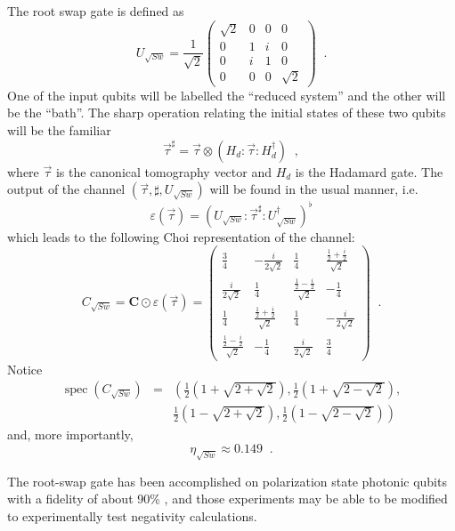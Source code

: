 The root swap gate is defined as
$$
U_{\sqrt{Sw}} = \frac{1}{\sqrt{2}}\begin{pmatrix}
\sqrt{2}&0&0&0\\
0&1&i&0\\
0&i&1&0\\
0&0&0&\sqrt{2}
\end{pmatrix}\;\;.
$$
One of the input qubits will be labelled the ``reduced system'' and the other will be the ``bath''.  The sharp operation relating the initial states of these two qubits will be the familiar 
$$
\vec{\tau}^\sharp = \vec{\tau}\otimes\left(H_d:\vec{\tau}:H_d^\dagger\right)\;\;,
$$
where $\vec{\tau}$ is the canonical tomography vector and $H_d$ is the Hadamard gate.  The output of the channel $(\vec{\tau},\sharp,U_{\sqrt{Sw}})$ will be found in the usual manner, i.e.\
$$
\varepsilon(\vec{\tau}) = \left(U_{\sqrt{Sw}}:\vec{\tau}^\sharp:U_{\sqrt{Sw}}^\dagger\right)^\flat
$$
which leads to the following Choi representation of the channel:
$$
C_{\sqrt{Sw}} = \mathbf{C}\odot\varepsilon\left(\vec{\tau}\right) =
\begin{pmatrix}
 \frac{3}{4} & -\frac{i}{2 \sqrt{2}} & \frac{1}{4} & \frac{\frac{1}{2}+\frac{i}{2}}{\sqrt{2}} \\
 \frac{i}{2 \sqrt{2}} & \frac{1}{4} & \frac{\frac{1}{2}-\frac{i}{2}}{\sqrt{2}} & -\frac{1}{4} \\
 \frac{1}{4} & \frac{\frac{1}{2}+\frac{i}{2}}{\sqrt{2}} & \frac{1}{4} & -\frac{i}{2 \sqrt{2}} \\
 \frac{\frac{1}{2}-\frac{i}{2}}{\sqrt{2}} & -\frac{1}{4} & \frac{i}{2 \sqrt{2}} & \frac{3}{4}
\end{pmatrix}\;\;.
$$
Notice
\begin{eqnarray*}
\operatorname{spec}(C_{\sqrt{Sw}}) &=& \left(\frac{1}{2} \left(1+\sqrt{2+\sqrt{2}}\right),\frac{1}{2} \left(1+\sqrt{2-\sqrt{2}}\right),\right.\\
& &\left. \frac{1}{2} \left(1-\sqrt{2+\sqrt{2}}\right),\frac{1}{2} \left(1-\sqrt{2-\sqrt{2}}\right)\right)
\end{eqnarray*}
and, more importantly,
$$
\eta_{\sqrt{Sw}} \approx 0.149\;\;.
$$

The root-swap gate has been accomplished on polarization state photonic qubits with a fidelity of about 90\% \cite{Cernoch2008}, and those experiments may be able to be modified to experimentally test negativity calculations.  

